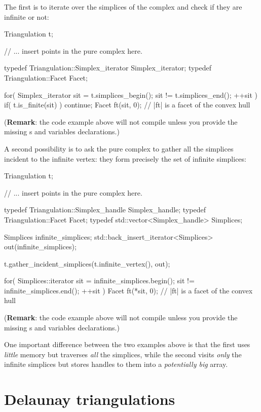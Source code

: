 {{The first is to iterate over the simplices of the complex and check if they
are infinite or not:

\begin{ccExampleCode}
Triangulation t;

// ... insert points in the pure complex here.

typedef Triangulation::Simplex_iterator Simplex_iterator;
typedef Triangulation::Facet Facet;

for( Simplex_iterator sit = t.simplices_begin(); sit != t.simplices_end(); ++sit )
{
    if( t.is_finite(sit) )
        continue;
    Facet ft(sit, 0); // |ft| is a facet of the convex hull
}
\end{ccExampleCode}
(\textbf{Remark}: the code example above will not compile unless you provide
the missing s and variables declarations.)

A second possibility is to ask the pure complex to gather all the simplices
incident to the infinite vertex: they form precisely the set of infinite
simplices:

\begin{ccExampleCode}
Triangulation t;

// ... insert points in the pure complex here.

typedef Triangulation::Simplex_handle Simplex_handle;
typedef Triangulation::Facet Facet;
typedef std::vector<Simplex_handle> Simplices;

Simplices infinite_simplices;
std::back_insert_iterator<Simplices> out(infinite_simplices);

t.gather_incident_simplices(t.infinite_vertex(), out);

for( Simplices::iterator sit = infinite_simplices.begin(); sit != infinite_simplices.end(); ++sit )
{
    Facet ft(*sit, 0); // |ft| is a facet of the convex hull
}
\end{ccExampleCode}
(\textbf{Remark}: the code example above will not compile unless you provide
the missing s and variables declarations.)

One important difference between the two examples above is that the first uses
\emph{little} memory but traverses \emph{all} the simplices, while the second
visits \emph{only} the infinite simplices but stores handles to them into a
\emph{potentially big} array.


\section{Delaunay triangulations}%

}}
